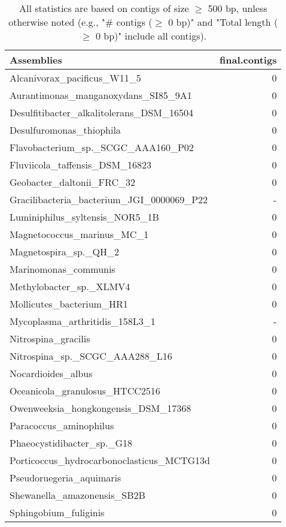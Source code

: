 \documentclass[12pt,a4paper]{article}
\begin{document}
\begin{table}[ht]
\begin{center}
\caption{All statistics are based on contigs of size $\geq$ 500 bp, unless otherwise noted (e.g., "\# contigs ($\geq$ 0 bp)" and "Total length ($\geq$ 0 bp)" include all contigs).}
\begin{tabular}{|l*{1}{|r}|}
\hline
Assemblies & final.contigs \\ \hline
Alcanivorax\_pacificus\_W11\_5 & 0 \\ \hline
Aurantimonas\_manganoxydans\_SI85\_9A1 & 0 \\ \hline
Desulfitibacter\_alkalitolerans\_DSM\_16504 & 0 \\ \hline
Desulfuromonas\_thiophila & 0 \\ \hline
Flavobacterium\_sp.\_SCGC\_AAA160\_P02 & 0 \\ \hline
Fluviicola\_taffensis\_DSM\_16823 & 0 \\ \hline
Geobacter\_daltonii\_FRC\_32 & 0 \\ \hline
Gracilibacteria\_bacterium\_JGI\_0000069\_P22 & - \\ \hline
Luminiphilus\_syltensis\_NOR5\_1B & 0 \\ \hline
Magnetococcus\_marinus\_MC\_1 & 0 \\ \hline
Magnetospira\_sp.\_QH\_2 & 0 \\ \hline
Marinomonas\_communis & 0 \\ \hline
Methylobacter\_sp.\_XLMV4 & 0 \\ \hline
Mollicutes\_bacterium\_HR1 & 0 \\ \hline
Mycoplasma\_arthritidis\_158L3\_1 & - \\ \hline
Nitrospina\_gracilis & 0 \\ \hline
Nitrospina\_sp.\_SCGC\_AAA288\_L16 & 0 \\ \hline
Nocardioides\_albus & 0 \\ \hline
Oceanicola\_granulosus\_HTCC2516 & 0 \\ \hline
Owenweeksia\_hongkongensis\_DSM\_17368 & 0 \\ \hline
Paracoccus\_aminophilus & 0 \\ \hline
Phaeocystidibacter\_sp.\_G18 & 0 \\ \hline
Porticoccus\_hydrocarbonoclasticus\_MCTG13d & 0 \\ \hline
Pseudoruegeria\_aquimaris & 0 \\ \hline
Shewanella\_amazonensis\_SB2B & 0 \\ \hline
Sphingobium\_fuliginis & 0 \\ \hline

\end{tabular}
\end{center}
\end{table}
\end{document}
